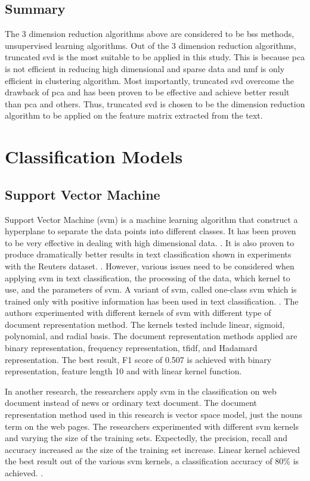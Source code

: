 \subsection{Summary}
The 3 dimension reduction algorithms above are considered to be \ac{bss} methods, unsupervised learning algorithms. Out of the 3 dimension reduction algorithms, truncated \ac{svd} is the most suitable to be applied in this study. This is because \ac{pca} is not efficient in reducing high dimensional and sparse data and \ac{nmf} is only efficient in clustering algorithm. Most importantly, truncated \ac{svd} overcome the drawback of \ac{pca} and has been proven to be effective and achieve better result than \ac{pca} and others. Thus, truncated \ac{svd} is chosen to be the dimension reduction algorithm to be applied on the feature matrix extracted from the text.

\section{Classification Models}
\subsection{Support Vector Machine}
Support Vector Machine (\ac{svm}) is a machine learning algorithm that construct a hyperplane to separate the data points into different classes. It has been proven to be very effective in dealing with high dimensional data. \cite{webSvm}. It is also proven to produce dramatically better results in text classification shown in experiments with the Reuters dataset. \cite{inductiveText}. However, various issues need to be considered when applying \ac{svm} in text classification, the processing of the data, which kernel to use, and the parameters of \ac{svm}. A variant of \ac{svm}, called one-class \ac{svm} which is trained only with positive information has been used in text classification. \cite{oneSvm}.  The authors experimented with different kernels of \ac{svm} with different type of document representation method. The kernels tested include linear, sigmoid, polynomial, and radial basis. The document representation methods applied are binary representation, frequency representation, \ac{tfidf}, and Hadamard representation. The best result, F1 score of 0.507 is achieved with binary representation, feature length 10 and with linear kernel function.  

In another research, the researchers apply \ac{svm} in the classification on web document instead of news or ordinary text document. The document representation method used in this research is vector space model, just the nouns term on the web pages. The researchers experimented with different \ac{svm} kernels and varying the size of the training sets. Expectedly, the precision, recall and accuracy increased as the size of the training set increase. Linear kernel achieved the best result out of the various \ac{svm} kernels, a classification accuracy of 80\% is achieved. \cite{webSvm}.
	
